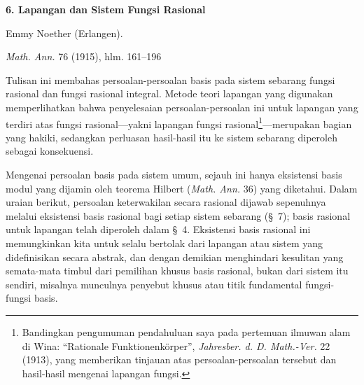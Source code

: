\documentclass[11pt,a4paper]{article}
\begin{document}
\begin{center}
{\Large\bfseries 6. Lapangan dan Sistem Fungsi Rasional}\par
\vspace{0.6em}
Emmy Noether (Erlangen).\par
\vspace{1.2em}
\emph{Math. Ann.} 76 (1915), hlm. 161--196
\end{center}

\vspace{2em}

{\sloppy Tulisan ini membahas persoalan-persoalan basis pada sistem sebarang fungsi rasional dan fungsi rasional integral. Metode teori lapangan yang digunakan memperlihatkan bahwa penyelesaian persoalan-persoalan ini untuk lapangan yang terdiri atas fungsi rasional---yakni lapangan fungsi rasional\footnote{Bandingkan pengumuman pendahuluan saya pada pertemuan ilmuwan alam di Wina: ``Rationale Funktionenkörper'', \emph{Jahresber. d. D. Math.-Ver.} 22 (1913), yang memberikan tinjauan atas persoalan-persoalan tersebut dan hasil-hasil mengenai lapangan fungsi.}---merupakan bagian yang hakiki, sedangkan perluasan hasil-hasil itu ke sistem sebarang diperoleh sebagai konsekuensi.\par}

Mengenai persoalan basis pada sistem umum, sejauh ini hanya eksistensi basis modul yang dijamin oleh teorema Hilbert (\emph{Math. Ann.} 36) yang diketahui. Dalam uraian berikut, persoalan keterwakilan secara rasional dijawab sepenuhnya melalui eksistensi basis rasional bagi setiap sistem sebarang (\S\ 7); basis rasional untuk lapangan telah diperoleh dalam \S\ 4. Eksistensi basis rasional ini memungkinkan kita untuk selalu bertolak dari lapangan atau sistem yang didefinisikan secara abstrak, dan dengan demikian menghindari kesulitan yang semata-mata timbul dari pemilihan khusus basis rasional, bukan dari sistem itu sendiri, misalnya munculnya penyebut khusus atau titik fundamental fungsi-fungsi basis.
\end{document}

